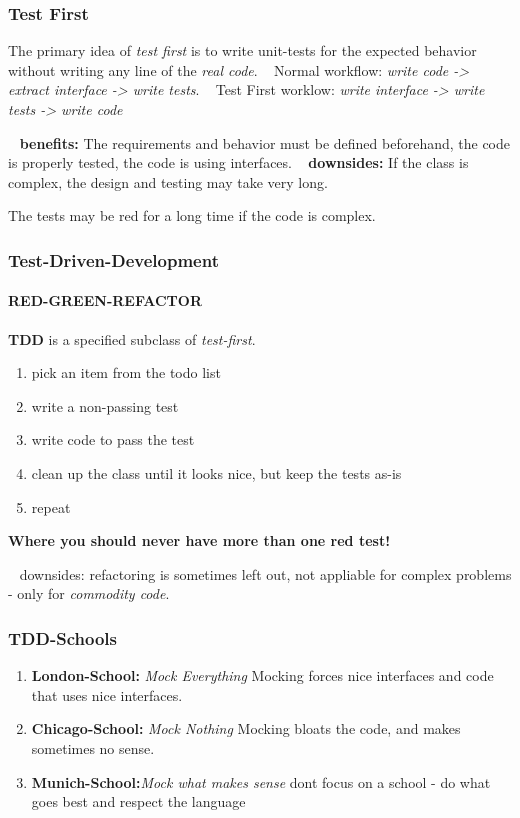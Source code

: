 \documentclass[12pt]{beamer}
\begin{document}
	\begin{frame}
		\frametitle{Test First}
		The primary idea of \textit{test first} is to write unit-tests for the expected behavior without writing any line of the \textit{real code}. 
		~\newline
		Normal workflow: \textit{write code -> extract interface -> write tests}. 
		~\newline
		Test First worklow: \textit{write interface -> write tests -> write code}

		~\newline
		\textbf{benefits:} The requirements and behavior must be defined beforehand, the code is properly tested, the code is using interfaces.
		~\newline
		\textbf{downsides:} If the class is complex, the design and testing may take very long. 
		
		The tests may be red for a long time if the code is complex. 	

\end{frame}

	\begin{frame}
		\frametitle{Test-Driven-Development}
		\framesubtitle{RED-GREEN-REFACTOR}
		\textbf{TDD} is a specified subclass of \textit{test-first}. 
		\begin{enumerate}
			\item pick an item from the todo list
			\item write a non-passing test
			\item write code to pass the test
			\item clean up the class until it looks nice, but keep the tests as-is
			\item repeat
		\end{enumerate}
		\textbf{Where you should never have more than one red test!}
	
	
		~\newline
		downsides: refactoring is sometimes left out, not appliable for complex problems - only for \textit{commodity code}.
	\end{frame}

	\begin{frame}
		\frametitle{TDD-Schools}
		\begin{enumerate}
			\item \textbf{London-School:} \textit{Mock Everything} \newline Mocking forces nice interfaces and code that uses nice interfaces.  
			\item \textbf{Chicago-School:} \textit{Mock Nothing} 
			\newline Mocking bloats the code, and makes sometimes no sense. 
			\item \textbf{Munich-School:}\textit{Mock what makes sense} 
			\newline dont focus on a school - do what goes best and respect the language 
		\end{enumerate}
	\end{frame}
	
\end{document}
